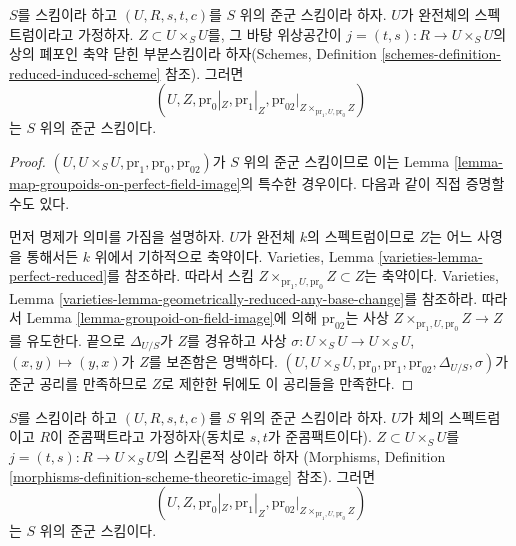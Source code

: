 \begin{lemma}
\label{lemma-groupoid-on-perfect-field-image}
$S$를 스킴이라 하고 $(U, R, s, t, c)$를 $S$ 위의 준군 스킴이라 하자.
$U$가 완전체의 스펙트럼이라고 가정하자. $Z \subset U \times_S U$를,
그 바탕 위상공간이 $j = (t, s) : R \to U \times_S U$의 상의 폐포인
축약 닫힌 부분스킴이라 하자(Schemes, Definition
\ref{schemes-definition-reduced-induced-scheme} 참조). 그러면
$$
(U, Z, \text{pr}_0|_Z, \text{pr}_1|_Z,
\text{pr}_{02}|_{Z \times_{\text{pr}_1, U, \text{pr}_0} Z})
$$
는 $S$ 위의 준군 스킴이다.
\end{lemma}

\begin{proof}
$(U, U \times_S U, \text{pr}_1, \text{pr}_0, \text{pr}_{02})$가
$S$ 위의 준군 스킴이므로 이는 Lemma
\ref{lemma-map-groupoids-on-perfect-field-image}의 특수한 경우이다.
다음과 같이 직접 증명할 수도 있다.

\medskip\noindent
먼저 명제가 의미를 가짐을 설명하자. $U$가 완전체 $k$의 스펙트럼이므로
$Z$는 어느 사영을 통해서든 $k$ 위에서 기하적으로 축약이다. Varieties, Lemma
\ref{varieties-lemma-perfect-reduced}를 참조하라. 따라서 스킴
$Z \times_{\text{pr}_1, U, \text{pr}_0} Z \subset Z$는 축약이다.
Varieties, Lemma \ref{varieties-lemma-geometrically-reduced-any-base-change}를
참조하라. 따라서 Lemma \ref{lemma-groupoid-on-field-image}에 의해
$\text{pr}_{02}$는 사상
$Z \times_{\text{pr}_1, U, \text{pr}_0} Z \to Z$를 유도한다.
끝으로 $\Delta_{U/S}$가 $Z$를 경유하고 사상
$\sigma : U \times_S U \to U \times_S U$, $(x, y) \mapsto (y, x)$가
$Z$를 보존함은 명백하다.
$(U, U \times_S U, \text{pr}_0, \text{pr}_1, \text{pr}_{02},
\Delta_{U/S}, \sigma)$가 준군 공리를 만족하므로 $Z$로 제한한 뒤에도
이 공리들을 만족한다.
\end{proof}

\begin{lemma}
\label{lemma-quasi-compact-groupoid-on-field-image}
$S$를 스킴이라 하고 $(U, R, s, t, c)$를 $S$ 위의 준군 스킴이라 하자.
$U$가 체의 스펙트럼이고 $R$이 준콤팩트라고 가정하자(동치로
$s, t$가 준콤팩트이다). $Z \subset U \times_S U$를
$j = (t, s) : R \to U \times_S U$의 스킴론적 상이라 하자
(Morphisms, Definition \ref{morphisms-definition-scheme-theoretic-image} 참조).
그러면
$$
(U, Z, \text{pr}_0|_Z, \text{pr}_1|_Z,
\text{pr}_{02}|_{Z \times_{\text{pr}_1, U, \text{pr}_0} Z})
$$
는 $S$ 위의 준군 스킴이다.
\end{lemma}

